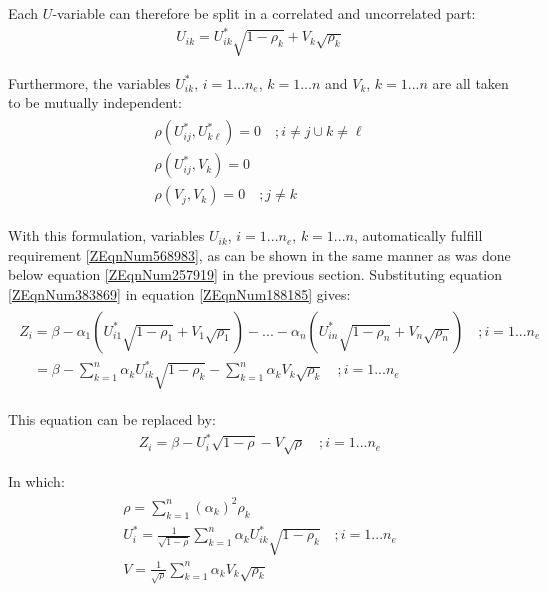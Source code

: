 {Each $U$-variable can therefore be split in a correlated and uncorrelated part: 
\begin{align}
U_{ik} =U_{ik}^{*} \sqrt{1-\rho _{k} } +V_{k} \sqrt{\rho _{k} } \label{ZEqnNum383869} 
\end{align}

Furthermore, the variables $U_{ik}^{*}$, $i=1...n_e$, $k=1...n$ and  $V_k$, $k=1...n$ are all taken to be mutually independent:
\begin{align}
\begin{array}{l} {\rho \left(U_{ij}^{*} ,U_{k\ell }^{*} \right)=0\quad ;i\ne j\cup k\ne \ell } \\ {\rho \left(U_{ij}^{*} ,V_{k} \right)=0} \\ {\rho \left(V_{j} ,V_{k} \right)=0\quad ;j\ne k} \end{array}\label{ZEqnNum753050} 
\end{align}

With this formulation, variables $U_{ik}$, $i=1...n_e$, $k=1...n$, automatically fulfill requirement \eqref{ZEqnNum568983}, as can be shown in the same manner as was done below equation \eqref{ZEqnNum257919} in the previous section.
Substituting equation \eqref{ZEqnNum383869} in equation \eqref{ZEqnNum188185} gives:
\begin{align}
\begin{array}{l} {Z_{i} =\beta -\alpha _{1} \left(U_{i1}^{*} \sqrt{1-\rho _{1} } +V_{1} \sqrt{\rho _{1} } \right)-...-\alpha _{n} \left(U_{in}^{*} \sqrt{1-\rho _{n} } +V_{n} \sqrt{\rho _{n} } \right)\quad ;i=1...n_{e} } \\ {\quad =\beta -\sum _{k=1}^{n}\alpha _{k}  U_{ik}^{*} \sqrt{1-\rho _{k} } -\sum _{k=1}^{n}\alpha _{k} V_{k}  \sqrt{\rho _{k} } \quad ;i=1...n_{e} } \end{array}\label{0.152)} 
\end{align}

This equation can be replaced by:
\begin{align}
Z_{i} =\beta -U_{i}^{*} \sqrt{1-\rho } -V\sqrt{\rho } \quad ;i=1...n_{e} \label{ZEqnNum395894} 
\end{align}

In which:
\begin{align}
\begin{array}{l} {\rho =\sum _{k=1}^{n}\left(\alpha _{k} \right)^{2}  \rho _{k} } \\ {U_{i}^{*} =\frac{1}{\sqrt{1-\rho } } \sum _{k=1}^{n}\alpha _{k} U_{ik}^{*} \sqrt{1-\rho _{k} }  \quad ;i=1...n_{e} } \\ {V=\frac{1}{\sqrt{\rho } } \sum _{k=1}^{n}\alpha _{k} V_{k}  \sqrt{\rho _{k} } } \end{array}\label{ZEqnNum809022} 
\end{align}

}
